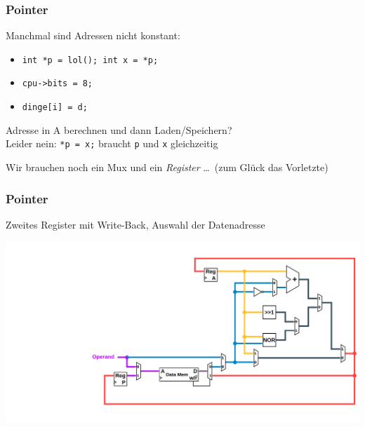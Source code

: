 \documentclass[t,aspectratio=169,usenames,dvipsnames]{beamer}
\begin{document}
\begin{frame}
  \frametitle{Pointer}

  Manchmal sind Adressen nicht konstant:
  \begin{itemize}
  \item \texttt{int *p = lol(); int x = *p;}
  \item \texttt{cpu->bits = 8;}
  \item \texttt{dinge[i] = d;}
  \end{itemize}

  \bigskip

  Adresse in A berechnen und dann Laden/Speichern?\\
  Leider nein: \texttt{*p = x;} braucht \texttt{p} und \texttt{x} gleichzeitig

  \bigskip
  \pause

  Wir brauchen noch ein Mux und ein \emph{Register} \ldots\ (zum Glück das Vorletzte)

\end{frame}

\begin{frame}
  \frametitle{Pointer}

  \strut{}Zweites Register mit Write-Back, Auswahl der Datenadresse

  \begin{center}
    \includegraphics[width=.85\textwidth]{sch-pointer.pdf}
  \end{center}
\end{frame}
\end{document}
